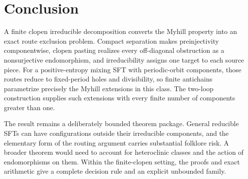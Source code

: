 \section{Conclusion}
\label{sec:conclusion}

A finite clopen irreducible decomposition converts the Myhill property into
an exact route exclusion problem.  Compact separation makes preinjectivity
componentwise, clopen pasting realizes every off-diagonal obstruction as a
nonsurjective endomorphism, and irreducibility assigns one target to each
source piece.  For a positive-entropy mixing SFT with periodic-orbit
components, those routes reduce to fixed-period holes and divisibility, so
finite antichains parametrize precisely the Myhill extensions in this class.
The two-loop construction supplies such extensions with every finite number
of components greater than one.

The result remains a deliberately bounded theorem package.  General
reducible SFTs can have configurations outside their irreducible components,
and the elementary form of the routing argument carries substantial folklore
risk.  A broader theorem would need to account for heteroclinic classes and
the action of endomorphisms on them.  Within the finite-clopen setting, the
proofs and exact arithmetic give a complete decision rule and an explicit
unbounded family.

